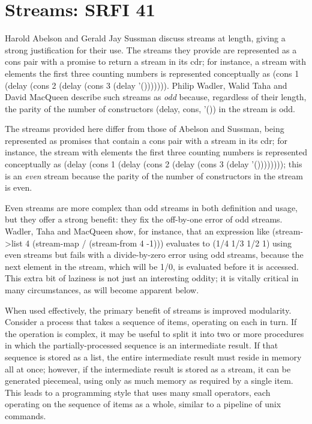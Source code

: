 \section{Streams: SRFI 41}

Harold Abelson and Gerald Jay Sussman discuss streams at length, giving
a strong justification for their use. The streams they provide are
represented as a cons pair with a promise to return a stream in its cdr;
for instance, a stream with elements the first three counting numbers is
represented conceptually as (cons 1 (delay (cons 2 (delay (cons 3 (delay
'())))))). Philip Wadler, Walid Taha and David MacQueen describe such
streams as \emph{odd} because, regardless of their length, the parity of
the number of constructors (delay, cons, '()) in the stream is odd.

The streams provided here differ from those of Abelson and Sussman,
being represented as promises that contain a cons pair with a stream in
its cdr; for instance, the stream with elements the first three counting
numbers is represented conceptually as (delay (cons 1 (delay (cons 2
(delay (cons 3 (delay '()))))))); this is an \emph{even} stream because
the parity of the number of constructors in the stream is even.

Even streams are more complex than odd streams in both definition and
usage, but they offer a strong benefit: they fix the off-by-one error of
odd streams. Wadler, Taha and MacQueen show, for instance, that an
expression like (stream-\textgreater{}list 4 (stream-map / (stream-from
4 -1))) evaluates to (1/4 1/3 1/2 1) using even streams but fails with a
divide-by-zero error using odd streams, because the next element in the
stream, which will be 1/0, is evaluated before it is accessed. This
extra bit of laziness is not just an interesting oddity; it is vitally
critical in many circumstances, as will become apparent below.

When used effectively, the primary benefit of streams is improved
modularity. Consider a process that takes a sequence of items, operating
on each in turn. If the operation is complex, it may be useful to split
it into two or more procedures in which the partially-processed sequence
is an intermediate result. If that sequence is stored as a list, the
entire intermediate result must reside in memory all at once; however,
if the intermediate result is stored as a stream, it can be generated
piecemeal, using only as much memory as required by a single item. This
leads to a programming style that uses many small operators, each
operating on the sequence of items as a whole, similar to a pipeline of
unix commands.


